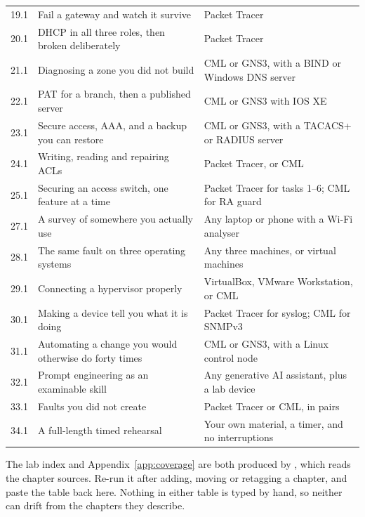 \begin{longtable}{@{}L{1.6cm}L{8.6cm}L{4.5cm}@{}}
19.1 & Fail a gateway and watch it survive & Packet Tracer \\
20.1 & DHCP in all three roles, then broken deliberately & Packet Tracer \\
21.1 & Diagnosing a zone you did not build & CML or GNS3, with a BIND or Windows DNS server \\
22.1 & PAT for a branch, then a published server & CML or GNS3 with IOS XE \\
23.1 & Secure access, AAA, and a backup you can restore & CML or GNS3, with a TACACS+ or RADIUS server \\
24.1 & Writing, reading and repairing ACLs & Packet Tracer, or CML \\
25.1 & Securing an access switch, one feature at a time & Packet Tracer for tasks 1--6; CML for RA guard \\
27.1 & A survey of somewhere you actually use & Any laptop or phone with a Wi-Fi analyser \\
28.1 & The same fault on three operating systems & Any three machines, or virtual machines \\
29.1 & Connecting a hypervisor properly & VirtualBox, VMware Workstation, or CML \\
30.1 & Making a device tell you what it is doing & Packet Tracer for syslog; CML for SNMPv3 \\
31.1 & Automating a change you would otherwise do forty times & CML or GNS3, with a Linux control node \\
32.1 & Prompt engineering as an examinable skill & Any generative AI assistant, plus a lab device \\
33.1 & Faults you did not create & Packet Tracer or CML, in pairs \\
34.1 & A full-length timed rehearsal & Your own material, a timer, and no interruptions \\
\bottomrule
\end{longtable}

\begin{conceptbox}
The lab index and Appendix~\ref{app:coverage} are both produced by
, which reads the chapter sources. Re-run it after
adding, moving or retagging a chapter, and paste the table back here. Nothing in
either table is typed by hand, so neither can drift from the chapters they
describe.
\end{conceptbox}


